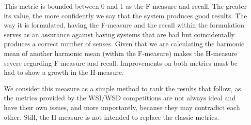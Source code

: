 This metric is bounded between 0 and 1 as the F-measure and recall. The greater its value, the more confidently we  say that the system produces good results. The way it is formulated, having the F-measure and the recall within the formulation serves as an assurance against having systems that are bad but coincidentally produces a correct number of senses. Given that we are calculating the harmonic mean of another harmonic mean (within the F-measure) makes the H-measure severe regarding F-measure and recall. Improvements on both metrics must be had to show a growth in  the H-measure.

We consider this measure as a simple method to rank the results that follow, as the metrics provided by the WSI/WSD competitions are not always ideal and have their own issues, and more importantly, because they may contradict each other. Still, the H-measure is not intended to replace the classic metrics. 


